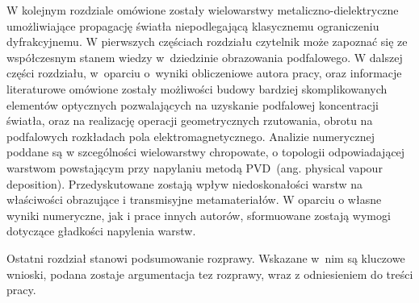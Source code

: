 W kolejnym rozdziale omówione zostały wielowarstwy metaliczno-dielektryczne umożliwiające propagację światła niepodlegającą klasycznemu ograniczeniu dyfrakcyjnemu. W pierwszych częściach rozdziału czytelnik może zapoznać się ze współczesnym stanem wiedzy w~dziedzinie obrazowania podfalowego. W dalszej części rozdziału, w~oparciu o~wyniki obliczeniowe autora pracy, oraz informacje literaturowe omówione zostały możliwości budowy bardziej skomplikowanych elementów optycznych pozwalających na uzyskanie podfalowej koncentracji światła, oraz na realizację operacji geometrycznych rzutowania, obrotu na podfalowych rozkładach pola elektromagnetycznego. Analizie numerycznej poddane są w szcególności wielowarstwy chropowate, o topologii odpowiadającej warstwom powstającym przy napylaniu metodą PVD~(ang. physical vapour deposition). Przedyskutowane zostają wpływ niedoskonałości warstw na właściwości obrazujące i transmisyjne metamateriałów. W oparciu o własne wyniki numeryczne, jak i prace innych autorów, sformuowane zostają wymogi dotyczące gładkości napylenia warstw.

Ostatni rozdział stanowi podsumowanie rozprawy. Wskazane w~nim są kluczowe wnioski, podana zostaje argumentacja tez rozprawy, wraz z odniesieniem do treści pracy.
